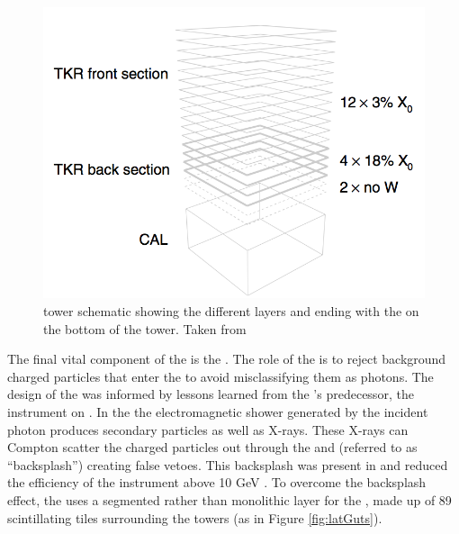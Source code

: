 \begin{figure}[h!t]
	\centering
	\includegraphics[width=1.0\columnwidth]{Figures/latPerf_Tower.png}
	\caption[LAT tower schematic ]{\lat{} tower schematic showing the different \tkr{}layers and ending with the \calo{} on the bottom of the tower. Taken from \cite{lat_perf}}
	\label{fig:Tower}
\end{figure}

The final vital component of the \lat{} is the \acd{}. The role of the \acd{} is to reject background charged particles that enter the \lat{} to avoid misclassifying them as photons. The design of the \acd{} was informed by lessons learned from the \lat{}'s predecessor, the \egret{} instrument on \cgro{} \citep{Mosieev05}. In the \calo{} the electromagnetic shower generated by the incident photon produces secondary particles as well as X-rays. These X-rays can Compton scatter the charged particles out through the 
\tkr{} and \acd{} (referred to as ``backsplash'') creating false vetoes. This backsplash was present in \egret{} and reduced the efficiency of the instrument above 10 GeV \cite{atwood09}. To overcome the backsplash effect, the \lat{} uses a segmented rather than monolithic layer for the \acd{}, made up of 89 scintillating tiles surrounding the towers (as in Figure \ref{fig:latGuts}).

